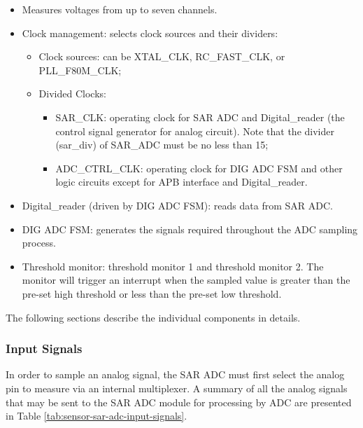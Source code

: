 \documentclass[main\_\_EN.tex]{subfiles}
\begin{document}
\begin{itemize}
    \item Measures voltages from up to seven channels.
    \item Clock management: selects clock sources and their dividers:
        \begin{itemize}
            \item Clock sources: can be XTAL\_CLK, RC\_FAST\_CLK, or PLL\_F80M\_CLK;
            \item Divided Clocks:
             \begin{itemize}
                 \item SAR\_CLK: operating clock for SAR ADC and Digital\_reader (the control signal generator for analog circuit). Note that the divider (sar\_div) of SAR\_ADC must be no less than 15;
                 \item ADC\_CTRL\_CLK: operating clock for DIG ADC FSM and other logic circuits except for APB interface and Digital\_reader.
             \end{itemize}
        \end{itemize}
    \item \label{other:sensor-item-read-data-from-sar-adc} Digital\_reader (driven by DIG ADC FSM): reads data from SAR ADC. 
    \item DIG ADC FSM: generates the signals required throughout the ADC sampling process.
    \item Threshold monitor: threshold monitor 1 and threshold monitor 2. The monitor will trigger an interrupt when the sampled value is greater than the pre-set high threshold or less than the pre-set low threshold.
\end{itemize}
The following sections describe the individual components in details.

\subsubsection{Input Signals}

In order to sample an analog signal, the SAR ADC must first select the analog pin to measure via an internal multiplexer. A summary of all the analog signals that may be sent to the SAR ADC module for processing by ADC are presented in Table \ref{tab:sensor-sar-adc-input-signals}.
\end{document}
